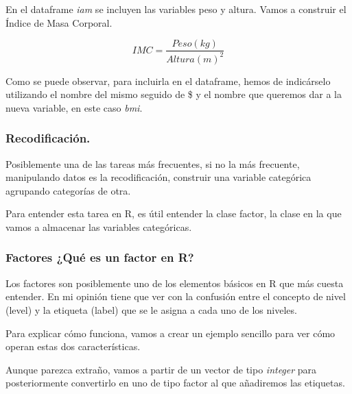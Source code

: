 \documentclass[
  letterpaper,
  DIV=11,
  numbers=noendperiod]{scrreprt}
\newenvironment{Shaded}{\begin{snugshade}}{\end{snugshade}}
\newcommand{\DecValTok}[1]{\textcolor[rgb]{0.68,0.00,0.00}{#1}}
\newcommand{\NormalTok}[1]{\textcolor[rgb]{0.00,0.23,0.31}{#1}}
\newcommand{\OtherTok}[1]{\textcolor[rgb]{0.00,0.23,0.31}{#1}}
\newcommand{\SpecialCharTok}[1]{\textcolor[rgb]{0.37,0.37,0.37}{#1}}
\begin{document}
En el dataframe \emph{iam} se incluyen las variables peso y altura.
Vamos a construir el Índice de Masa Corporal.

\[IMC=\frac{Peso (kg)}{Altura(m)^2}\]

\begin{Shaded}
\end{Shaded}

Como se puede observar, para incluirla en el dataframe, hemos de
indicárselo utilizando el nombre del mismo seguido de \$ y el nombre que
queremos dar a la nueva variable, en este caso \emph{bmi}.

\hypertarget{recodificaciuxf3n.}{%
\subsubsection{Recodificación.}\label{recodificaciuxf3n.}}

Posiblemente una de las tareas más frecuentes, si no la más frecuente,
manipulando datos es la recodificación, construir una variable
categórica agrupando categorías de otra.

Para entender esta tarea en R, es útil entender la clase factor, la
clase en la que vamos a almacenar las variables categóricas.

\hypertarget{factores-quuxe9-es-un-factor-en-r}{%
\subsubsection{Factores ¿Qué es un factor en
R?}\label{factores-quuxe9-es-un-factor-en-r}}

Los factores son posiblemente uno de los elementos básicos en R que más
cuesta entender. En mi opinión tiene que ver con la confusión entre el
concepto de nivel (level) y la etiqueta (label) que se le asigna a cada
uno de los niveles.

Para explicar cómo funciona, vamos a crear un ejemplo sencillo para ver
cómo operan estas dos características.

Aunque parezca extraño, vamos a partir de un vector de tipo
\emph{integer} para posteriormente convertirlo en uno de tipo factor al
que añadiremos las etiquetas.
\end{document}
